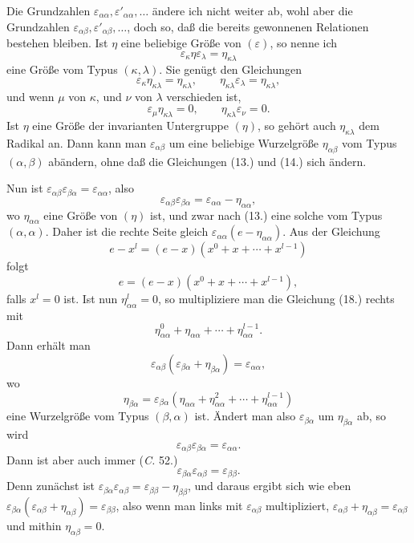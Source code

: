 \documentclass[11pt]{article}
\newcommand{\eps}{\varepsilon}
\begin{document}
Die Grundzahlen $\eps_{\alpha\alpha},\eps'_{\alpha\alpha},\ldots$ ändere ich nicht weiter ab, wohl aber die Grundzahlen $\eps_{\alpha\beta},\eps'_{\alpha\beta},\ldots$, doch so, daß die bereits gewonnenen Relationen bestehen bleiben. Ist $\eta$ eine beliebige Größe von $(\eps)$, so nenne ich
\begin{equation}\tag{15.}
 \eps_\kappa\eta\eps_\lambda=\eta_{\kappa\lambda}
\end{equation}
eine Größe vom Typus $(\kappa,\lambda)$. Sie genügt den Gleichungen
\begin{equation}\tag{16.}
 \eps_\kappa\eta_{\kappa\lambda}=\eta_{\kappa\lambda},
 \qquad
 \eta_{\kappa\lambda}\eps_\lambda=\eta_{\kappa\lambda},
\end{equation}
und wenn $\mu$ von $\kappa$, und $\nu$ von $\lambda$ verschieden ist,
\begin{equation}\tag{17.}
 \eps_\mu\eta_{\kappa\lambda}=0,
 \qquad
 \eta_{\kappa\lambda}\eps_\nu=0.
\end{equation}
Ist $\eta$ eine Größe der invarianten Untergruppe $(\eta)$, so gehört auch $\eta_{\kappa\lambda}$ dem Radikal an. Dann kann man $\eps_{\alpha\beta}$ um eine beliebige Wurzelgröße $\eta_{\alpha\beta}$ vom Typus $(\alpha,\beta)$ abändern, ohne daß die Gleichungen (13.) und (14.) sich ändern.

Nun ist $\eps_{\alpha\beta}\eps_{\beta\alpha}=\eps_{\alpha\alpha}$, also
\begin{equation}\tag{18.}
 \eps_{\alpha\beta}\eps_{\beta\alpha}=\eps_{\alpha\alpha}-\eta_{\alpha\alpha},
\end{equation}
wo $\eta_{\alpha\alpha}$ eine Größe von $(\eta)$ ist, und zwar nach (13.) eine solche vom Typus $(\alpha,\alpha)$. Daher ist die rechte Seite gleich $\eps_{\alpha\alpha}(e-\eta_{\alpha\alpha})$. Aus der Gleichung
\[
 e-x^l=(e-x)(x^0+x+\cdots+x^{l-1})
\]
folgt
\[
 e=(e-x)(x^0+x+\cdots+x^{l-1}),
\]
falls $x^l=0$ ist. Ist nun $\eta_{\alpha\alpha}^l=0$, so multipliziere man die Gleichung (18.) rechts mit
\[
 \eta_{\alpha\alpha}^{0}+\eta_{\alpha\alpha}+\cdots+\eta_{\alpha\alpha}^{l-1}.
\]
Dann erhält man
\[
 \eps_{\alpha\beta}(\eps_{\beta\alpha}+\eta_{\beta\alpha})=\eps_{\alpha\alpha},
\]
wo
\[
 \eta_{\beta\alpha}=\eps_{\beta\alpha}(\eta_{\alpha\alpha}+\eta_{\alpha\alpha}^2+\cdots+\eta_{\alpha\alpha}^{l-1})
\]
eine Wurzelgröße vom Typus $(\beta,\alpha)$ ist. Ändert man also $\eps_{\beta\alpha}$ um $\eta_{\beta\alpha}$ ab, so wird
\begin{equation}\tag{19.}
 \eps_{\alpha\beta}\eps_{\beta\alpha}=\eps_{\alpha\alpha}.
\end{equation}
Dann ist aber auch immer (\emph{C.} 52.)
\begin{equation}\tag{20.}
 \eps_{\beta\alpha}\eps_{\alpha\beta}=\eps_{\beta\beta}.
\end{equation}
Denn zunächst ist $\eps_{\beta\alpha}\eps_{\alpha\beta}=\eps_{\beta\beta}-\eta_{\beta\beta}$, und daraus ergibt sich wie eben $\eps_{\beta\alpha}(\eps_{\alpha\beta}+\eta_{\alpha\beta})=\eps_{\beta\beta}$, also wenn man links mit $\eps_{\alpha\beta}$ multipliziert, $\eps_{\alpha\beta}+\eta_{\alpha\beta}=\eps_{\alpha\beta}$ und mithin $\eta_{\alpha\beta}=0$.
\end{document}
